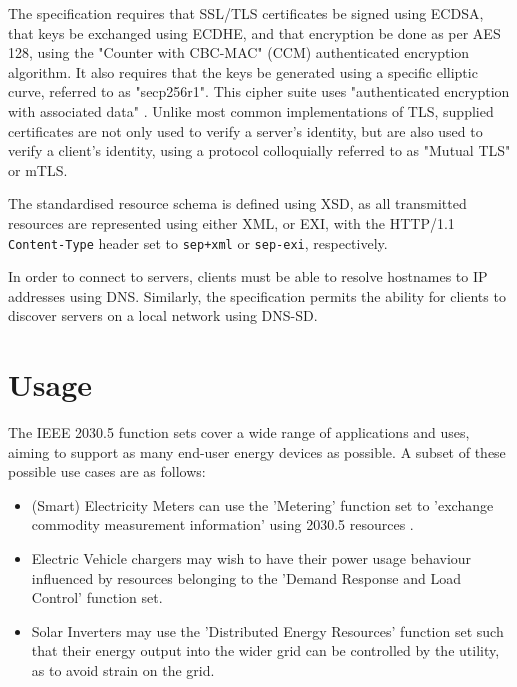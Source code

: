 The specification requires that SSL/TLS certificates be signed using ECDSA, that keys be exchanged using ECDHE, and that encryption be done as per AES 128, using the "Counter with CBC-MAC" (CCM) authenticated encryption algorithm. It also requires that the keys be generated using a specific elliptic curve, referred to as "secp256r1". This cipher suite uses "authenticated encryption with associated data" \cite{IEEE2030.5}. 
Unlike most common implementations of TLS, supplied certificates are not only used to verify a server's identity, but are also used to verify a client's identity, using a protocol colloquially referred to as "Mutual TLS" or mTLS. \cite{AUSDOE}

The standardised resource schema is defined using XSD, as all transmitted resources are represented using either XML, or EXI, with the HTTP/1.1 \texttt{Content-Type} header set to \texttt{sep+xml} or \texttt{sep-exi}, respectively.

In order to connect to servers, clients must be able to resolve hostnames to IP addresses using DNS. Similarly, the specification permits the ability for clients to discover servers on a local network using DNS-SD.

\section{Usage}
The IEEE 2030.5 function sets cover a wide range of applications and uses, aiming to support as many end-user energy devices as possible. A subset of these possible use cases are as follows:
\begin{itemize}
    \item (Smart) Electricity Meters can use the 'Metering' function set to 'exchange commodity measurement information' using 2030.5 resources \cite{IEEE2030.5}. 
    \item Electric Vehicle chargers may wish to have their power usage behaviour influenced by resources belonging to the 'Demand Response and Load Control' function set.
    \item Solar Inverters may use the 'Distributed Energy Resources' function set such that their energy output into the wider grid can be controlled by the utility, as to avoid strain on the grid.
\end{itemize}
